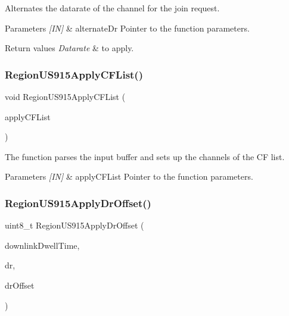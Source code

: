 Alternates the datarate of the channel for the join request. 


\begin{DoxyParams}{Parameters}
{\em \mbox{[}\+I\+N\mbox{]}} & alternate\+Dr Pointer to the function parameters.\\
\hline
\end{DoxyParams}

\begin{DoxyRetVals}{Return values}
{\em Datarate} & to apply. \\
\hline
\end{DoxyRetVals}
\mbox{\label{group__REGIONUS915_ga072949ee3a416e1bfbe2b3a2c478b13b}} 
\subsubsection{\texorpdfstring{Region\+U\+S915\+Apply\+C\+F\+List()}{RegionUS915ApplyCFList()}}
{\footnotesize\ttfamily void Region\+U\+S915\+Apply\+C\+F\+List (\begin{DoxyParamCaption}\item[{\hyperlink{group__REGION_ga71588e9ad07e34b78fa91d51881fd3c6}{Apply\+C\+F\+List\+Params\+\_\+t} $\ast$}]{apply\+C\+F\+List }\end{DoxyParamCaption})}



The function parses the input buffer and sets up the channels of the CF list. 


\begin{DoxyParams}{Parameters}
{\em \mbox{[}\+I\+N\mbox{]}} & apply\+C\+F\+List Pointer to the function parameters. \\
\hline
\end{DoxyParams}
\mbox{\label{group__REGIONUS915_ga3a13a700c4bbd1a703aaf73740f9f13c}} 
\subsubsection{\texorpdfstring{Region\+U\+S915\+Apply\+Dr\+Offset()}{RegionUS915ApplyDrOffset()}}
{\footnotesize\ttfamily uint8\+\_\+t Region\+U\+S915\+Apply\+Dr\+Offset (\begin{DoxyParamCaption}\item[{uint8\+\_\+t}]{downlink\+Dwell\+Time,  }\item[{int8\+\_\+t}]{dr,  }\item[{int8\+\_\+t}]{dr\+Offset }\end{DoxyParamCaption})}



